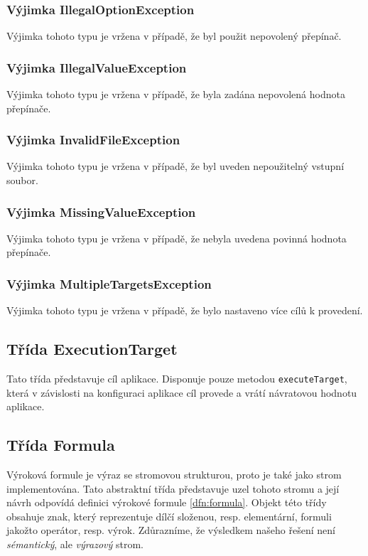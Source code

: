 \documentclass[thesis=B,czech,hidelinks]{thesis}[2012/06/26]
\begin{document}
\subsubsection{Výjimka IllegalOptionException}

Výjimka tohoto typu je vržena v případě, že byl použit nepovolený přepínač.

\subsubsection{Výjimka IllegalValueException}

Výjimka tohoto typu je vržena v případě, že byla zadána nepovolená hodnota přepínače.

\subsubsection{Výjimka InvalidFileException}

Výjimka tohoto typu je vržena v případě, že byl uveden nepoužitelný vstupní soubor.

\subsubsection{Výjimka MissingValueException}

Výjimka tohoto typu je vržena v případě, že nebyla uvedena povinná hodnota přepínače.

\subsubsection{Výjimka MultipleTargetsException}

Výjimka tohoto typu je vržena v případě, že bylo nastaveno více cílů k provedení.

\subsection{Třída ExecutionTarget}

Tato třída představuje cíl aplikace. Disponuje pouze metodou \texttt{executeTarget}, která v závislosti na konfiguraci aplikace cíl provede a vrátí návratovou hodnotu aplikace.

\subsection{Třída Formula}

Výroková formule je výraz se stromovou strukturou, proto je také jako strom implementována. Tato abstraktní třída představuje uzel tohoto stromu a její návrh odpovídá definici výrokové formule \ref{dfn:formula}. Objekt této třídy obsahuje znak, který reprezentuje dílčí složenou, resp. elementární, formuli jakožto operátor, resp. výrok. Zdůrazníme, že výsledkem našeho řešení není \emph{sémantický}, ale \emph{výrazový} strom.
\end{document}
